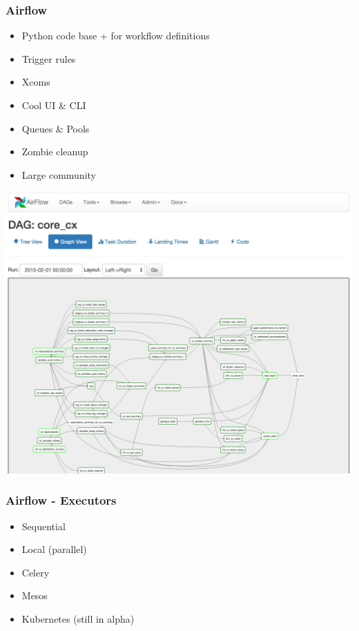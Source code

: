 \documentclass[12pt]{beamer}
\begin{document}
        \begin{frame}
            \frametitle{Airflow}
            \begin{itemize}
                \pause
                \item Python code base + for workflow definitions
                \pause
                \item Trigger rules
                \pause
                \item Xcoms
                \pause
                \item Cool UI \& CLI
                \pause
                \item Queues \& Pools
                \pause
                \item Zombie cleanup
                \pause
                \item Large community
            \end{itemize}
        \end{frame}
        
        \begin{frame}
            \begin{center}
                \includegraphics[width=1\textwidth]{images/workflow.png}
            \end{center}
        \end{frame}

        \begin{frame}
            \frametitle{Airflow - Executors}
            \begin{itemize}
                \item Sequential
                \item Local (parallel)
                \item Celery
                \item Mesos
                \item Kubernetes (still in alpha)
            \end{itemize}
        \end{frame}
\end{document}
